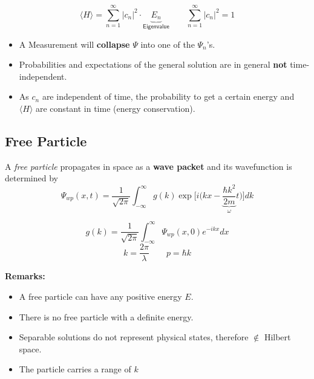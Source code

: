 \noindent\begin{equation*}
    \langle H\rangle=\sum_{n=1}^\infty|c_n|^2\cdot \underbrace{E_n}_{\textsf{Eigenvalue}} \qquad \sum_{n=1}^\infty|c_n|^2 =1
\end{equation*}

\begin{itemize}
    \item A Measurement will \textbf{collapse} $\Psi$ into one of the $\Psi_n$'s.
    \item Probabilities and expectations of the general solution are in general \textbf{not} time-independent.
    \item As $c_n$ are independent of time, the probability to get a certain energy and $\langle H\rangle$ are constant in time (energy conservation).
\end{itemize}

\subsection{Free Particle}
A \textit{free particle} propagates in space as a \textbf{wave packet} and its wavefunction is determined by
\noindent\begin{equation*}
    \Psi_{wp}(x,t)=\frac{1}{\sqrt{2\pi}}\int_{-\infty}^{\infty}g(k)\exp\Biggl[i\Biggl(kx- \underbrace{\frac{\hbar k^{2}}{2m}}_{\omega}t\Biggr)\Biggr]dk
\end{equation*}

\noindent\begin{equation*}
    g(k)=\frac{1}{\sqrt{2\pi}}\int_{-\infty}^{\infty}\Psi_{wp}(x,0)e^{-ikx}dx
\end{equation*}
\begin{equation*}
    k  = \frac{2\pi}{\lambda}\qquad p  = \hbar k
\end{equation*}

\textbf{Remarks:}

\begin{itemize}
    \item A free particle can have any positive energy $E$.
    \item There is no free particle with a definite energy.
    \item Separable solutions do not represent physical states, therefore $\notin$ Hilbert space.
    \item The particle carries a range of $k$
\end{itemize}

